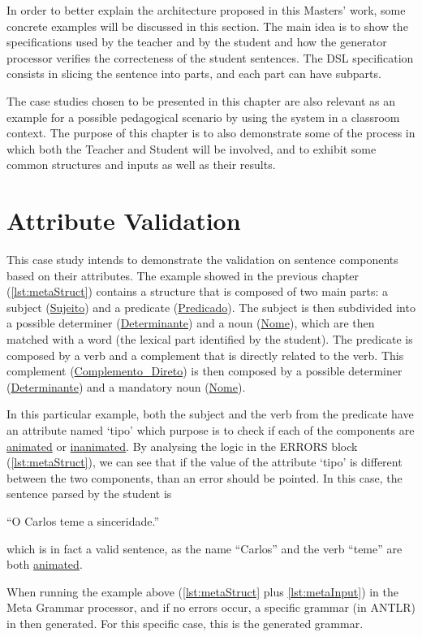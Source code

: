 In order to better explain the architecture proposed in this Masters' work, 
some concrete examples will be discussed in this section. 
The main idea is to show the specifications used by the teacher and by the student and how the generator processor verifies the correcteness of the student sentences. 
The DSL specification consists in slicing the sentence into parts, and each part can have subparts.

The case studies chosen to be presented in this chapter are also relevant as an example for a possible pedagogical scenario by using the system in a classroom context.
The purpose of this chapter is to also demonstrate some of the process in which both the Teacher and Student will be involved, and to exhibit some common structures
and inputs as well as their results.

\section{Attribute Validation}
This case study intends to demonstrate the validation on sentence components based on their attributes. The example showed in the previous chapter 
(\autoref{lst:metaStruct}) contains a structure that is composed of two main parts: a subject (\underline{Sujeito}) and a predicate (\underline{Predicado}). 
The subject is then subdivided into a possible determiner (\underline{Determinante}) and a noun (\underline{Nome}), which are then matched with a word 
(the lexical part identified by the student). The predicate is composed by a verb and a complement that is directly related to the verb. This complement 
(\underline{Complemento\_Direto}) is then composed by a possible determiner (\underline{Determinante}) and a mandatory noun (\underline{Nome}).

In this particular example, both the subject and the verb from the predicate have an attribute named ‘tipo’ which purpose is to check if each of the components
are \underline{animated} or \underline{inanimated}. By analysing the logic in the ERRORS block (\autoref{lst:metaStruct}), we can see that if the value of the attribute ‘tipo’ is different 
between the two components, than an error should be pointed. In this case, the sentence parsed by the student is

``O Carlos teme a sinceridade.''

\noindent which is in fact a valid sentence, as the name ``Carlos'' and the verb ``teme'' are both \underline{animated}.

When running the example above (\autoref{lst:metaStruct} plus \autoref{lst:metaInput}) in the Meta Grammar processor, and if no errors occur, a specific grammar (in ANTLR) 
in then generated. For this specific case, this is the generated grammar.

